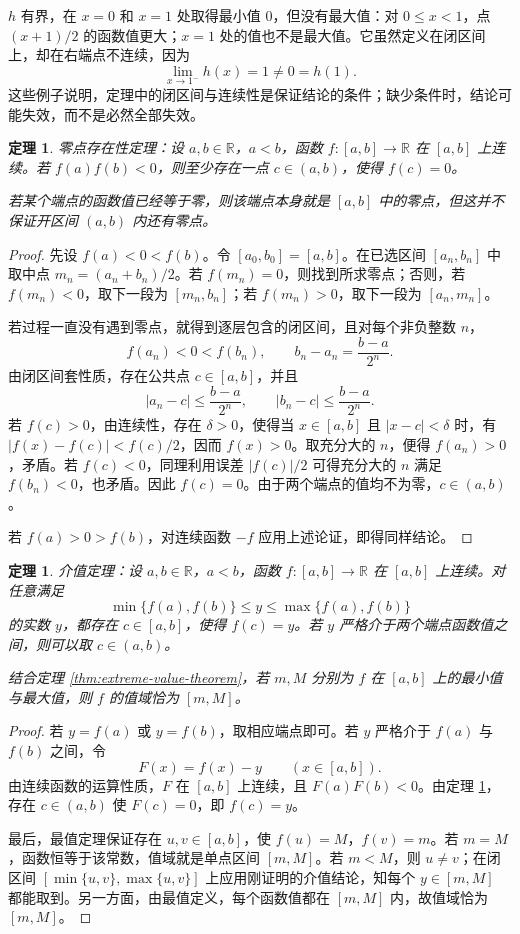\documentclass[UTF8,fontset=fandol,11pt]{ctexart}
\newtheorem{theorem}[definition]{定理}
\begin{document}
$h$ 有界，在 $x=0$ 和 $x=1$ 处取得最小值 $0$，但没有最大值：对 $0\leq x<1$，点 $(x+1)/2$ 的函数值更大；$x=1$ 处的值也不是最大值。它虽然定义在闭区间上，却在右端点不连续，因为
\[
\lim_{x\to1^-}h(x)=1\neq0=h(1).
\]
这些例子说明，定理中的闭区间与连续性是保证结论的条件；缺少条件时，结论可能失效，而不是必然全部失效。\par
\begin{theorem}
\label{thm:zero-existence-theorem}零点存在性定理：设 $a,b\in\mathbb{R}$，$a<b$，函数 $f:[a,b]\to\mathbb{R}$ 在 $[a,b]$ 上连续。若 $f(a)f(b)<0$，则至少存在一点 $c\in(a,b)$，使得 $f(c)=0$。

若某个端点的函数值已经等于零，则该端点本身就是 $[a,b]$ 中的零点，但这并不保证开区间 $(a,b)$ 内还有零点。
\end{theorem}
\begin{proof}
先设 $f(a)<0<f(b)$。令 $[a_0,b_0]=[a,b]$。在已选区间 $[a_n,b_n]$ 中取中点 $m_n=(a_n+b_n)/2$。若 $f(m_n)=0$，则找到所求零点；否则，若 $f(m_n)<0$，取下一段为 $[m_n,b_n]$；若 $f(m_n)>0$，取下一段为 $[a_n,m_n]$。

若过程一直没有遇到零点，就得到逐层包含的闭区间，且对每个非负整数 $n$，
\[
f(a_n)<0<f(b_n),\qquad b_n-a_n=\frac{b-a}{2^n}.
\]
由闭区间套性质，存在公共点 $c\in[a,b]$，并且
\[
|a_n-c|\leq\frac{b-a}{2^n},\qquad |b_n-c|\leq\frac{b-a}{2^n}.
\]
若 $f(c)>0$，由连续性，存在 $\delta>0$，使得当 $x\in[a,b]$ 且 $|x-c|<\delta$ 时，有 $|f(x)-f(c)|<f(c)/2$，因而 $f(x)>0$。取充分大的 $n$，便得 $f(a_n)>0$，矛盾。若 $f(c)<0$，同理利用误差 $|f(c)|/2$ 可得充分大的 $n$ 满足 $f(b_n)<0$，也矛盾。因此 $f(c)=0$。由于两个端点的值均不为零，$c\in(a,b)$。

若 $f(a)>0>f(b)$，对连续函数 $-f$ 应用上述论证，即得同样结论。
\end{proof}
\begin{theorem}
\label{thm:intermediate-value-theorem}介值定理：设 $a,b\in\mathbb{R}$，$a<b$，函数 $f:[a,b]\to\mathbb{R}$ 在 $[a,b]$ 上连续。对任意满足
\[
\min\{f(a),f(b)\}\leq y\leq\max\{f(a),f(b)\}
\]
的实数 $y$，都存在 $c\in[a,b]$，使得 $f(c)=y$。若 $y$ 严格介于两个端点函数值之间，则可以取 $c\in(a,b)$。

结合定理 \ref{thm:extreme-value-theorem}，若 $m,M$ 分别为 $f$ 在 $[a,b]$ 上的最小值与最大值，则 $f$ 的值域恰为 $[m,M]$。
\end{theorem}
\begin{proof}
若 $y=f(a)$ 或 $y=f(b)$，取相应端点即可。若 $y$ 严格介于 $f(a)$ 与 $f(b)$ 之间，令
\[
F(x)=f(x)-y\qquad(x\in[a,b]).
\]
由连续函数的运算性质，$F$ 在 $[a,b]$ 上连续，且 $F(a)F(b)<0$。由定理 \ref{thm:zero-existence-theorem}，存在 $c\in(a,b)$ 使 $F(c)=0$，即 $f(c)=y$。

最后，最值定理保证存在 $u,v\in[a,b]$，使 $f(u)=M$，$f(v)=m$。若 $m=M$，函数恒等于该常数，值域就是单点区间 $[m,M]$。若 $m<M$，则 $u\neq v$；在闭区间 $[\min\{u,v\},\max\{u,v\}]$ 上应用刚证明的介值结论，知每个 $y\in[m,M]$ 都能取到。另一方面，由最值定义，每个函数值都在 $[m,M]$ 内，故值域恰为 $[m,M]$。
\end{proof}
\end{document}
